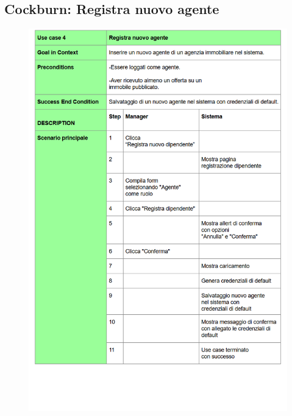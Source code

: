 \subsection{Cockburn: Registra nuovo agente} 

\begin{figure}[H]
	\centering
	\includegraphics[width=1\linewidth]{"Immagini/cockburn/registra nuovo agente principale.png"}
	\caption[CockBurn extensions: registra nuovo agente]{}
	\label{fig:registra-nuovo-agente-principale}
\end{figure}

\newpage

